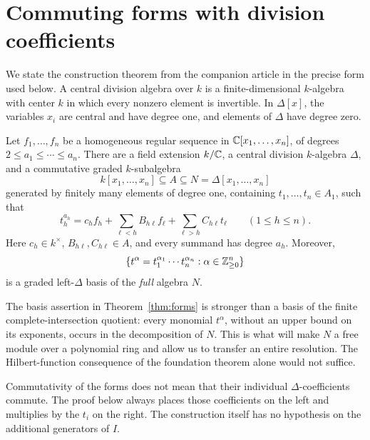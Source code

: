 \section{Commuting forms with division coefficients}\label{sec:forms}

We state the construction theorem from the companion article
\cite{ArtinianEGH} in the precise form used below. A central
division algebra over \(k\) is a finite-dimensional
\(k\)-algebra with center \(k\) in which every nonzero element is invertible.
In \(\Delta[x]\), the variables \(x_i\) are central and have degree one,
and elements of \(\Delta\) have degree zero.

\begin{theorem}
\label{thm:forms}
Let \(f_1,\ldots,f_n\) be a homogeneous regular sequence in
\(\mathbb C[x_1,\ldots,x_n]\), of degrees \(2\le a_1\le\cdots\le a_n\).
There are a field extension \(k/\mathbb C\), a central division \(k\)-algebra
\(\Delta\), and a commutative graded \(k\)-subalgebra
\[
 k[x_1,\ldots,x_n]\subseteq A\subseteq N=\Delta[x_1,\ldots,x_n]
\]
generated by finitely many elements of degree one, containing
\(t_1,\ldots,t_n\in A_1\), such that
\begin{equation}\label{eq:triangular-forms}
 t_h^{a_h}=c_h f_h+\sum_{\ell<h}B_{h\ell}f_\ell
                  +\sum_{\ell>h}C_{h\ell}t_\ell
 \qquad(1\le h\le n).
\end{equation}
Here \(c_h\in k^\times\), \(B_{h\ell},C_{h\ell}\in A\), and every summand
has degree \(a_h\). Moreover,
\[
 \{t^\alpha=t_1^{\alpha_1}\cdots t_n^{\alpha_n}:
       \alpha\in\mathbb Z_{\ge0}^n\}
\]
is a graded left-\(\Delta\) basis of the \emph{full} algebra \(N\).
\end{theorem}

The basis assertion in Theorem~\ref{thm:forms} is stronger than a basis of the finite
complete-intersection quotient: every monomial \(t^\alpha\), without
an upper bound on its exponents, occurs in the decomposition of \(N\).
This is what will make \(N\) a free module over a polynomial ring and
allow us to transfer an entire resolution. The Hilbert-function
consequence of the foundation theorem alone would not suffice.

\begin{remark}\label{rem:coefficients}
Commutativity of the forms does not mean that their individual
\(\Delta\)-coefficients commute. The proof below always places those
coefficients on the left and multiplies by the \(t_i\) on the right.
The construction itself has no hypothesis on the additional generators
of \(I\).
\end{remark}
